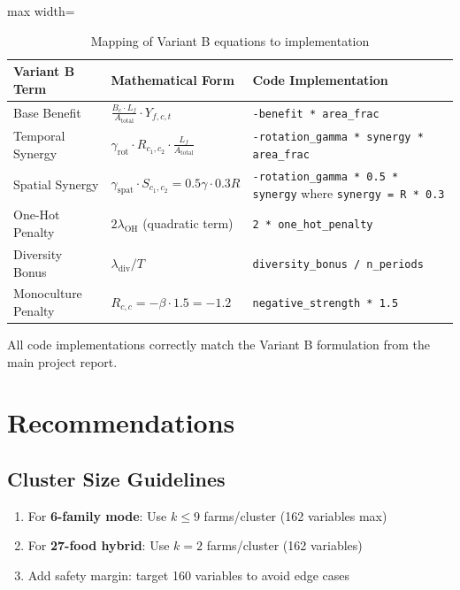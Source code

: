 \documentclass[11pt,a4paper]{article}
\begin{document}
\begin{table}[H]
\centering
\caption{Mapping of Variant B equations to implementation}
\begin{adjustbox}{max width=\textwidth}
\begin{tabular}{p{4cm}p{5cm}p{4cm}}
\toprule
\textbf{Variant B Term} & \textbf{Mathematical Form} & \textbf{Code Implementation} \\
\midrule
Base Benefit & $\frac{B_c \cdot L_f}{A_{\text{total}}} \cdot Y_{f,c,t}$ & \texttt{-benefit * area\_frac} \\
Temporal Synergy & $\gamma_{\text{rot}} \cdot R_{c_1,c_2} \cdot \frac{L_f}{A_{\text{total}}}$ & \texttt{-rotation\_gamma * synergy * area\_frac} \\
Spatial Synergy & $\gamma_{\text{spat}} \cdot S_{c_1,c_2} = 0.5\gamma \cdot 0.3R$ & \texttt{-rotation\_gamma * 0.5 * synergy} where \texttt{synergy = R * 0.3} \\
One-Hot Penalty & $2\lambda_{\text{OH}}$ (quadratic term) & \texttt{2 * one\_hot\_penalty} \\
Diversity Bonus & $\lambda_{\text{div}} / T$ & \texttt{diversity\_bonus / n\_periods} \\
Monoculture Penalty & $R_{c,c} = -\beta \cdot 1.5 = -1.2$ & \texttt{negative\_strength * 1.5} \\
\bottomrule
\end{tabular}
\end{adjustbox}
\end{table}

All code implementations correctly match the Variant B formulation from the main project report.

\section{Recommendations}

\subsection{Cluster Size Guidelines}

\begin{enumerate}
    \item For \textbf{6-family mode}: Use $k \leq 9$ farms/cluster (162 variables max)
    \item For \textbf{27-food hybrid}: Use $k = 2$ farms/cluster (162 variables)
    \item Add safety margin: target 160 variables to avoid edge cases
\end{enumerate}
\end{document}
